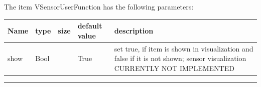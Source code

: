 The item VSensorUserFunction has the following parameters:\vspace{-1cm}\\ 
\begin{center}
  \footnotesize
  \begin{longtable}{| p{4.5cm} | p{2.5cm} | p{0.5cm} | p{2.5cm} | p{6cm} |}
    \hline
    \bf Name & \bf type & \bf size & \bf default value & \bf description \\ \hline
    show &     Bool &      &     True &     set true, if item is shown in visualization and false if it is not shown; sensor visualization CURRENTLY NOT IMPLEMENTED\\ \hline
	  \end{longtable}
	\end{center}
\par\noindent\rule{\textwidth}{0.4pt}
\label{description_SensorUserFunction}
